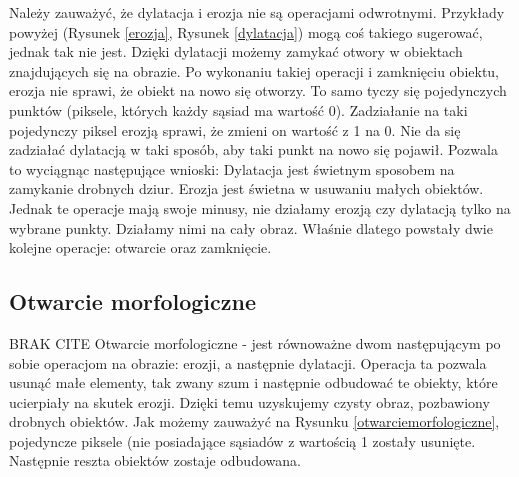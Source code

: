\documentclass{article}
\begin{document}
        {
            \Large
            \justifying
            \quad
            Należy zauważyć, że dylatacja i erozja nie są operacjami odwrotnymi.
            Przykłady powyżej (Rysunek \ref{erozja}, Rysunek \ref{dylatacja}) mogą coś takiego sugerować, jednak tak nie jest.
            Dzięki dylatacji możemy zamykać otwory w obiektach znajdujących się na obrazie.
            Po wykonaniu takiej operacji i zamknięciu obiektu, erozja nie sprawi, że obiekt na nowo się otworzy.
            To samo tyczy się pojedynczych punktów (piksele, których każdy sąsiad ma wartość 0).
            Zadziałanie na taki pojedynczy piksel erozją sprawi, że zmieni on wartość z 1 na 0.
            Nie da się zadziałać dylatacją w taki sposób, aby taki punkt na nowo się pojawił.
            Pozwala to wyciągnąc następujące wnioski:
            Dylatacja jest świetnym sposobem na zamykanie drobnych dziur.
            Erozja jest świetna w usuwaniu małych obiektów.
            Jednak te operacje mają swoje minusy, nie działamy erozją czy dylatacją tylko na wybrane punkty.
            Działamy nimi na cały obraz.
            Właśnie dlatego powstały dwie kolejne operacje: otwarcie oraz zamknięcie.
        }

        \newpage
        \subsection{Otwarcie morfologiczne}
        {
            BRAK CITE
            \label{sec:otwarcie-morfologiczne}
            \Large
            \justifying
            \quad
            Otwarcie morfologiczne - jest równoważne dwom następującym po sobie operacjom na obrazie: erozji, a następnie dylatacji.
            Operacja ta pozwala usunąć małe elementy, tak zwany szum i następnie odbudować te obiekty, które ucierpiały na skutek erozji.
            Dzięki temu uzyskujemy czysty obraz, pozbawiony drobnych obiektów.
            Jak możemy zauważyć na Rysunku \ref{otwarciemorfologiczne}, pojedyncze piksele (nie posiadające sąsiadów z wartością 1 zostały usunięte.
            Następnie reszta obiektów zostaje odbudowana.
        }
\end{document}
